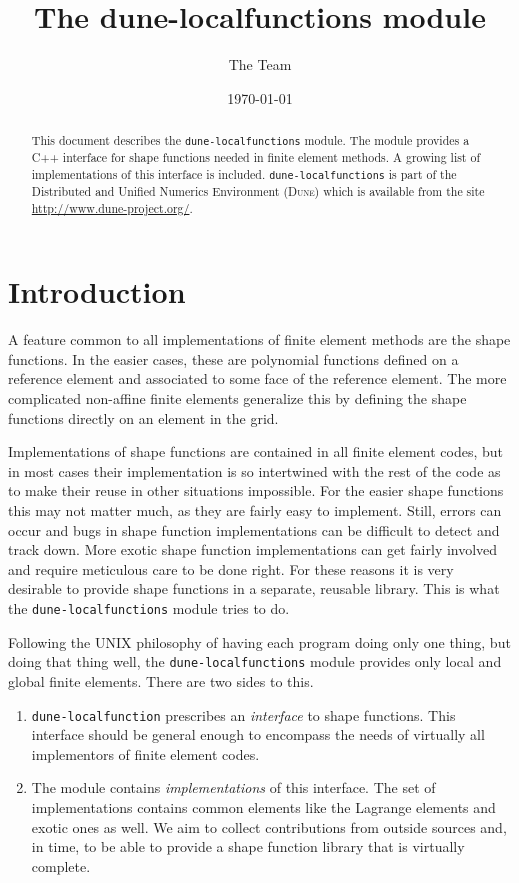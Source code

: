 \documentclass[a4paper,11pt]{article}
\title{The dune-localfunctions module}
\author{The \dune Team}
\date{\today}
\newcommand{\dune}{\textsc{Dune}\xspace}
\newcommand{\modulename}[1]{\texttt{#1}\xspace}
\begin{document}
\maketitle

\begin{abstract}
This document describes the \modulename{dune-localfunctions} module.
The module provides a C++ interface for shape functions needed in
finite element methods.  A growing list of implementations of this
interface is included. \modulename{dune-localfunctions}
is part of the Distributed and Unified Numerics Environment (\dune) which is
available from the site \url{http://www.dune-project.org/}.
\end{abstract}

\begin{multicols}{2}
{\small\tableofcontents}
\end{multicols}

\section{Introduction}

A feature common to all implementations of finite element methods are the
shape functions.  In the easier cases, these are polynomial functions
defined on a reference element and associated to some face of the reference
element.  The more complicated non-affine finite elements generalize this
by defining the shape functions directly on an element in the grid.

Implementations of shape functions are contained in all finite element codes,
but in most cases their implementation is so intertwined with the rest of
the code as to make their reuse in other situations impossible.
For the easier shape functions this may not matter much, as they are
fairly easy to implement.  Still, errors can occur and bugs in shape function
implementations can be difficult to detect and track down.
More exotic shape function implementations can get fairly involved
and require meticulous care to be done right.  For these reasons it is
very desirable to provide shape functions in a separate, reusable library.
This is what the \modulename{dune-localfunctions} module tries to do.


Following the UNIX philosophy of having each program doing only one thing,
but doing that thing well, the \modulename{dune-localfunctions} module
provides only local and global finite elements.  There are two sides to this.
\begin{enumerate}
 \item \modulename{dune-localfunction} prescribes an {\em interface} to shape functions.
  This interface
  should be general enough to encompass the needs of virtually all implementors
  of finite element codes.
 \item The module contains {\em implementations} of this interface.  The set
  of implementations contains common elements like the Lagrange elements and
  exotic ones as well.  We aim to collect contributions from outside sources
  and, in time, to be able to provide a shape function library that is virtually
  complete.
\end{enumerate}
\end{document}
